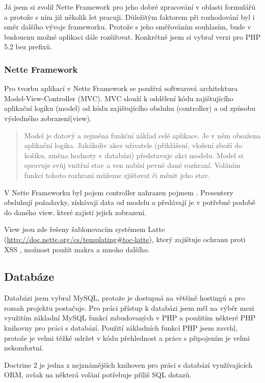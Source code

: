 \documentclass[thesis=B,czech]{FITthesis}[2011/06/14]
\begin{document}
Já jsem si zvolil Nette Framework pro jeho dobré zpracování v oblasti formulářů a protože s ním již několik let pracuji. Důležitým faktorem při rozhodování byl i směr dalšího vývoje frameworku. Protože s jeho směřováním souhlasím, bude v budoucnu možné aplikaci dále rozšiřovat. Konkrétně jsem si vybral verzi pro PHP 5.2 bez prefixů.

\subsubsection*{Nette Framework}\label{netteDescription}
Pro tvorbu aplikací v Nette Framework se používá softwarová architektura Model-View-Controller (MVC). MVC slouží k oddělení kódu zajištujícího aplikační logiku (model) od kódu zajištujícího obsluhu (controller) a od způsobu výsledného zobrazení(view).

\begin{quotation}
Model je datový a zejména funkční základ celé aplikace. Je v něm obsažena aplikační logika. Jakákoliv akce uživatele (přihlášení, vložení zboží do košíku, změna hodnoty v databázi) představuje akci modelu. Model si spravuje svůj vnitřní stav a ven nabízí pevně dané rozhraní. Voláním funkcí tohoto rozhraní můžeme zjišťovat či měnit jeho stav.
\cite{netteModel}
\end{quotation}

V Nette Frameworku byl pojem controller nahrazen pojmem . Presentery obsluhují požadavky, získávají data od modelu a předávají je v potřebné podobě do daného view, které zajistí jejich zobrazení.

View jsou zde řešeny šablonovacím systémem Latte (\url{http://doc.nette.org/cs/templating#toc-latte}), který zajištuje ochranu proti XSS \cite{xss}, možnost použít makra a mnoho dalšího.

\subsection{Databáze}
Databázi jsem vybral MySQL, protože je dostupná na většině hostingů a pro rozsah projektu postačuje. Pro práci přístup k databázi jsem měl na výběr mezi využitím základní MySQL funkcí zabudovaných v PHP a použitím některé PHP knihovny pro práci s databází. Použití základních funkcí PHP jsem zavrhl, protože je velmi těžké udržet v kódu přehlednost a práce s připojením je velmi nekomfortní.

Doctrine 2 je jedna z nejznámějších knihoven pro práci s databází využívajících ORM, avšak na některá volání potřebuje příliš SQL dotazů.
\end{document}
